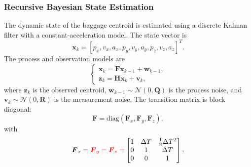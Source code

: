 \subsubsection{Recursive Bayesian State Estimation}
The dynamic state of the baggage centroid is estimated using a discrete Kalman filter with a constant-acceleration model. The state vector is
\begin{equation}
\boldsymbol{x}_{k}=[p_x,v_x,a_x,p_y,v_y,a_y,p_z,v_z,a_z]^T.
\end{equation}
The process and observation models are
\begin{equation}
\begin{cases}
\boldsymbol{x}_{k}=\boldsymbol{F}\boldsymbol{x}_{k-1}+\boldsymbol{w}_{k-1},\\
\boldsymbol{z}_{k}=\boldsymbol{H}\boldsymbol{x}_{k}+\boldsymbol{v}_{k},
\end{cases}
\label{eq:state}
\end{equation}
where $\boldsymbol{z}_{k}$ is the observed centroid, $\boldsymbol{w}_{k-1}\sim\mathcal{N}(0,\boldsymbol{Q})$ is the process noise, and $\boldsymbol{v}_{k}\sim\mathcal{N}(0,\boldsymbol{R})$ is the measurement noise.  The transition matrix is block diagonal:
\begin{equation}
\boldsymbol{F}=\mathrm{diag}(\boldsymbol{F}_{x},\boldsymbol{F}_{y},\boldsymbol{F}_{z}),
\end{equation}
with
\begin{equation}
\boldsymbol{F}_{x}={\color{red}\boldsymbol{F}_{y}=\boldsymbol{F}_{z}=}\begin{bmatrix}
1 & \Delta T & \frac{1}{2}\Delta T^{2}\\
0 & 1 & \Delta T\\
0 & 0 & 1
\end{bmatrix}.
\label{eq:fx}
\end{equation}

